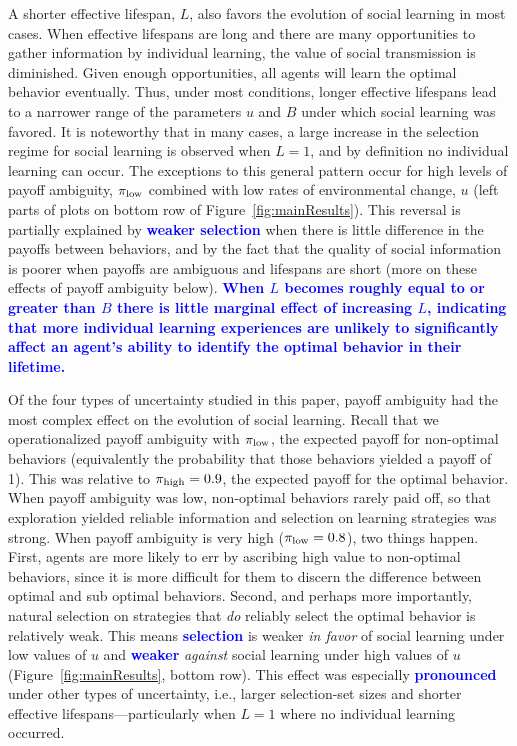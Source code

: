 \documentclass[letterpaper,11.5pt]{scrartcl}
\newcommand{\cm}[1]{{\textcolor{mypurple} {({\tiny CM:} #1)}}}
\newcommand{\edit}[1]{{\bfseries \textcolor{blue} {#1}}}
\begin{document}
A shorter effective lifespan, $L$, also favors the evolution of social learning in
most cases. When effective lifespans are long and there are many opportunities to
gather information by individual learning, the value of social transmission is
diminished. Given enough opportunities, all agents will learn the optimal behavior
eventually. Thus, under most conditions, longer effective lifespans lead to a
narrower range of the parameters $u$ and $B$ under which social learning was
favored. It is noteworthy that in many cases, a large increase in the selection
regime for social learning is observed when $L=1$, and by definition no individual
learning can occur. The exceptions to this general pattern occur for high levels of
payoff ambiguity, $\pi_{\mathrm{low}}$ combined with low rates of environmental change, $u$
(left parts of plots on bottom row of Figure~\ref{fig:mainResults}). This reversal
is partially explained by \edit{weaker selection} when there is little difference in the payoffs between
behaviors, and by the fact that the quality of social information is poorer when payoffs are ambiguous and
lifespans are short (more on these effects of payoff ambiguity below).  
\edit{When $L$ becomes roughly equal to or greater than $B$ there is little marginal effect of increasing $L$, indicating that more individual learning experiences are unlikely to significantly affect an agent's ability to identify the optimal behavior in their lifetime.}

Of the four types of uncertainty studied in this paper, payoff ambiguity had the most
complex effect on the evolution of social learning. Recall that we operationalized
payoff ambiguity with $\pi_{\mathrm{low}}$, the expected payoff for non-optimal behaviors
(equivalently the probability that those behaviors yielded a payoff of 1). This was
relative to $\pi_{\mathrm{high}} = 0.9$, the expected payoff for the optimal behavior. When
payoff ambiguity was low, non-optimal behaviors rarely paid off, so that exploration
yielded reliable information and selection on learning strategies was strong. When
payoff ambiguity is very high ($\pi_{\mathrm{low}} = 0.8$), two things happen. First, agents are
more likely to err by ascribing high value to non-optimal behaviors, since it is
more difficult for them to discern the difference between optimal and sub optimal
behaviors. Second, and perhaps more importantly, natural selection on strategies
that \emph{do} reliably select the optimal behavior is relatively weak. This means
\edit{selection} is weaker \emph{in favor} of social learning under low values of $u$ and
\edit{weaker} \emph{against} social learning under high values of $u$ (Figure~\ref{fig:mainResults}, bottom row). 
This effect was especially \edit{pronounced} under other types of uncertainty, i.e., larger selection-set sizes and shorter effective lifespans---particularly when $L=1$ where no individual learning occurred. 
\end{document}
